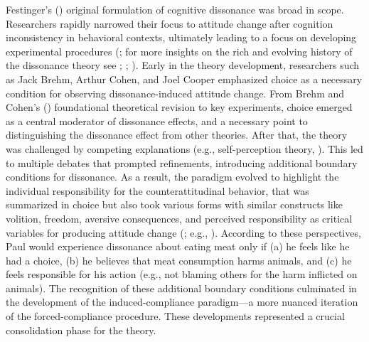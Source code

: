 \documentclass[
  letterpaper,
]{book}
\begin{document}
Festinger's () original
formulation of cognitive dissonance was broad in scope. Researchers
rapidly narrowed their focus to attitude change after cognition
inconsistency in behavioral contexts, ultimately leading to a focus on
developing experimental procedures
(; for more insights on the rich and evolving history of
the dissonance theory see ; ;
). Early in the theory development, researchers such as
Jack Brehm, Arthur Cohen, and Joel Cooper emphasized choice as a
necessary condition for observing dissonance-induced attitude change.
From Brehm and Cohen's ()
foundational theoretical revision to key experiments, choice emerged as
a central moderator of dissonance effects, and a necessary point to
distinguishing the dissonance effect from other theories. After that,
the theory was challenged by competing explanations (e.g.,
self-perception theory, ). This led to multiple debates that prompted refinements,
introducing additional boundary conditions for dissonance. As a result,
the paradigm evolved to highlight the individual responsibility for the
counterattitudinal behavior, that was summarized in choice but also took
various forms with similar constructs like volition, freedom, aversive
consequences, and perceived responsibility as critical variables for
producing attitude change (; e.g., ).
According to these perspectives, Paul would experience dissonance about
eating meat only if (a) he feels like he had a choice, (b) he believes
that meat consumption harms animals, and (c) he feels responsible for
his action (e.g., not blaming others for the harm inflicted on animals).
The recognition of these additional boundary conditions culminated in
the development of the induced-compliance paradigm---a more nuanced
iteration of the forced-compliance procedure. These developments
represented a crucial consolidation phase for the theory.
\end{document}

